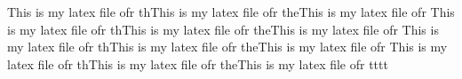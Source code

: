 This is my latex file ofr thThis is my latex file ofr theThis is my latex file ofr This is my latex file ofr thThis is my latex file ofr theThis is my latex file ofr This is my latex file ofr thThis is my latex file ofr theThis is my latex file ofr This is my latex file ofr thThis is my latex file ofr theThis is my latex file ofr tttt
